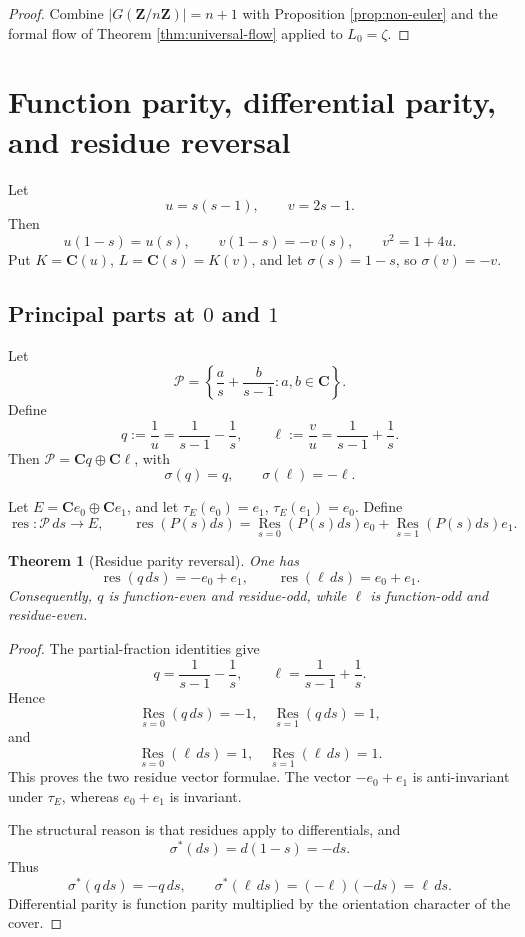 \documentclass[11pt]{article}
\newcommand{\C}{\mathbf C}
\newcommand{\Z}{\mathbf Z}
\newcommand{\Res}{\operatorname*{Res}}
\theoremstyle{plain}
\newtheorem{theorem}{Theorem}[section]
\theoremstyle{definition}
\numberwithin{equation}{section}
\begin{document}
\begin{proof}
Combine \(|G(\Z/n\Z)|=n+1\) with Proposition \ref{prop:non-euler} and the formal flow of Theorem \ref{thm:universal-flow} applied to \(L_0=\zeta\).
\end{proof}


\section{Function parity, differential parity, and residue reversal}\label{sec:parity}

Let
\[
 u=s(s-1),
 \qquad
 v=2s-1.
\]
Then
\[
 u(1-s)=u(s),
 \qquad
 v(1-s)=-v(s),
 \qquad
 v^2=1+4u.
\]
Put \(K=\C(u)\), \(L=\C(s)=K(v)\), and let \(\sigma(s)=1-s\), so \(\sigma(v)=-v\).

\subsection{Principal parts at \(0\) and \(1\)}

Let
\[
 \mathcal P=\left\{\frac as+\frac b{s-1}:a,b\in\C\right\}.
\]
Define
\[
 q:=\frac1u=\frac1{s-1}-\frac1s,
 \qquad
 \ell:=\frac vu=\frac1{s-1}+\frac1s.
\]
Then \(\mathcal P=\C q\oplus\C\ell\), with
\[
 \sigma(q)=q,
 \qquad
 \sigma(\ell)=-\ell.
\]

Let \(E=\C e_0\oplus\C e_1\), and let \(\tau_E(e_0)=e_1\), \(\tau_E(e_1)=e_0\).  Define
\[
 \operatorname{res}:\mathcal P\,ds\to E,
 \qquad
 \operatorname{res}(P(s)ds)=\Res_{s=0}(P(s)ds)e_0+
 \Res_{s=1}(P(s)ds)e_1.
\]

\begin{theorem}[Residue parity reversal]\label{thm:residue-reversal}
One has
\[
 \operatorname{res}(q\,ds)=-e_0+e_1,
 \qquad
 \operatorname{res}(\ell\,ds)=e_0+e_1.
\]
Consequently, \(q\) is function-even and residue-odd, while \(\ell\) is function-odd and residue-even.
\end{theorem}

\begin{proof}
The partial-fraction identities give
\[
 q=\frac1{s-1}-\frac1s,
 \qquad
 \ell=\frac1{s-1}+\frac1s.
\]
Hence
\[
 \Res_{s=0}(q\,ds)=-1,
 \quad
 \Res_{s=1}(q\,ds)=1,
\]
and
\[
 \Res_{s=0}(\ell\,ds)=1,
 \quad
 \Res_{s=1}(\ell\,ds)=1.
\]
This proves the two residue vector formulae.  The vector \(-e_0+e_1\) is anti-invariant under \(\tau_E\), whereas \(e_0+e_1\) is invariant.

The structural reason is that residues apply to differentials, and
\[
 \sigma^*(ds)=d(1-s)=-ds.
\]
Thus
\[
 \sigma^*(q\,ds)=-q\,ds,
 \qquad
 \sigma^*(\ell\,ds)=(-\ell)(-ds)=\ell\,ds.
\]
Differential parity is function parity multiplied by the orientation character of the cover.
\end{proof}
\end{document}
